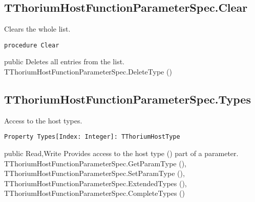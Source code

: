 \subsection{TThoriumHostFunctionParameterSpec.Clear}
\label{thoriumcorepkg:thorium:tthoriumhostfunctionparameterspec:clear}
\begin{FPCList}
\Synopsis
Clears the whole list.\Declaration 

\begin{verbatim}
procedure Clear
\end{verbatim}
\Visibility
public
\Description
Deletes all entries from the list.\SeeAlso
TThoriumHostFunctionParameterSpec.DeleteType (\pageref{thoriumcorepkg:thorium:tthoriumhostfunctionparameterspec:deletetype})\end{FPCList}
\subsection{TThoriumHostFunctionParameterSpec.Types}
\label{thoriumcorepkg:thorium:tthoriumhostfunctionparameterspec:types}
\begin{FPCList}
\Synopsis
Access to the host types.\Declaration 

\begin{verbatim}
Property Types[Index: Integer]: TThoriumHostType
\end{verbatim}
\Visibility
public
\Access
Read,Write
\Description
Provides access to the host type (\pageref{thoriumcorepkg:thorium}) part of a parameter.\SeeAlso
TThoriumHostFunctionParameterSpec.GetParamType (\pageref{thoriumcorepkg:thorium:tthoriumhostfunctionparameterspec:getparamtype}),
TThoriumHostFunctionParameterSpec.SetParamType (\pageref{thoriumcorepkg:thorium:tthoriumhostfunctionparameterspec:setparamtype}),
TThoriumHostFunctionParameterSpec.ExtendedTypes (\pageref{thoriumcorepkg:thorium:tthoriumhostfunctionparameterspec:extendedtypes}),
TThoriumHostFunctionParameterSpec.CompleteTypes (\pageref{thoriumcorepkg:thorium:tthoriumhostfunctionparameterspec:completetypes})\end{FPCList}
